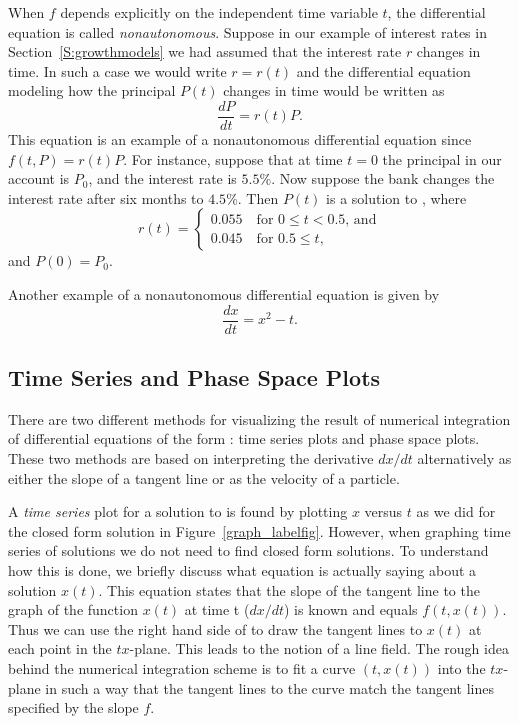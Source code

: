\documentclass{ximera}
\begin{document}
When $f$ depends explicitly on the independent time variable $t$,
the differential equation is called {\em nonautonomous\/}.
Suppose in our example of interest rates  in Section~\ref{S:growthmodels}
we had assumed that the interest rate $r$ changes in time.  In
such a case we would write $r=r(t)$ and the differential equation modeling 
how the principal $P(t)$ changes in time would be written as
\begin{equation}  \label{E:varinterest}
\frac{dP}{dt} = r(t)P.
\end{equation}
This equation is an example of a nonautonomous differential equation 
since $f(t,P) = r(t)P$.   For instance, suppose that at time $t=0$ the
principal in our account is $P_0$, and the interest rate is $5.5\%$.  
Now suppose the bank changes the interest rate after six months to $4.5\%$. 
Then $P(t)$ is a solution to , where
\[
  r(t) = \left\{\begin{array}{l}
     0.055\quad\mbox{for $0\le t < 0.5$, and}\\
     0.045\quad\mbox{for $0.5\le t$,}
  \end{array}\right.
\]
and $P(0)=P_0$.

Another example of a nonautonomous differential equation is given by
\begin{equation}  \label{dfeq}
\frac{dx}{dt} = x^2-t.
\end{equation}


\subsection*{Time Series and Phase Space Plots}

There are two different methods for visualizing the result of
numerical integration of differential equations of the form
: time series plots and phase space plots.  These
two methods are based on interpreting the derivative $dx/dt$
alternatively as either the slope of a tangent line or as the
velocity of a particle.

A {\em time series\/}  plot for a solution to
 is found by plotting $x$ versus $t$ as we did for
the closed form solution in Figure~\ref{graph_labelfig}.  However,
when graphing time series of solutions we do not need to find closed
form solutions.  To understand how this is done, we briefly discuss
what equation  is actually saying about a solution
$x(t)$.  This equation states that the slope of the tangent line
to the graph of the function $x(t)$ at time t ($dx/dt$) is known
and equals $f(t,x(t))$.  Thus we can use the right hand side of
 to draw the tangent lines to $x(t)$ at each point
in the $tx$-plane.  This leads to the notion of a line field.
The rough idea behind the numerical integration scheme is to fit
a curve $(t,x(t))$ into the $tx$-plane in such a way that the
tangent lines to the curve match the tangent lines specified by
the slope $f$.
\end{document}
